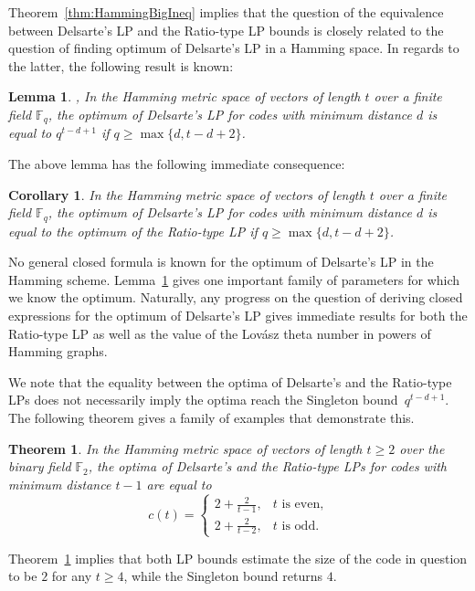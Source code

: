 \documentclass[a4paper]{article}
\newtheorem{corollary}[formula]{Corollary}
\newtheorem{lemma}[formula]{Lemma}
\newtheorem{theorem}[formula]{Theorem}
\newcommand{\F}{\mathbb{F}}
\begin{document}
Theorem~\ref{thm:HammingBigIneq} implies that the question of the equivalence between Delsarte's LP and the Ratio-type LP bounds is closely related to the question of finding optimum of Delsarte's LP in a Hamming space. In regards to the latter, the following result is known:

\begin{lemma}\label{l:DelOptHam}\cite{DelsarteLP}, \cite[Theorem 3.1(b)]{SW2025}
    In the Hamming metric space of vectors of length $t$ over a finite field $\F_q$, the optimum of Delsarte's LP for codes with minimum distance $d$ is equal to $q^{t-d+1}$ if $q\geq\max\{d,t-d+2\}$.
\end{lemma}

The above lemma has the following immediate consequence:

\begin{corollary}
    In the Hamming metric space of vectors of length $t$ over a finite field $\F_q$, the optimum of Delsarte's LP for codes with minimum distance $d$ is equal to the optimum of the Ratio-type LP if $q\geq\max\{d,t-d+2\}$.
\end{corollary}

No general closed formula is known for the optimum of Delsarte’s LP in the Hamming scheme. Lemma~\ref{l:DelOptHam} gives one important family of parameters for which we know the optimum. Naturally, any progress on the question of deriving closed expressions for the optimum of Delsarte’s LP gives immediate results for both the Ratio-type LP as well as the value of the Lov\'asz theta number in powers of Hamming graphs.

We note that the equality between the optima of Delsarte's and the Ratio-type LPs does not necessarily imply the optima reach the Singleton bound~$q^{t-d+1}$. The following theorem gives a family of examples that demonstrate this.

\begin{theorem}\label{thm:Ham_q=2_d=t-1}
    In the Hamming metric space of vectors of length $t\geq2$ over the binary field $\F_2$, the optima of Delsarte's and the Ratio-type LPs for codes with minimum distance $t-1$ are equal to 
    $$c(t)=\begin{cases}
        2+\frac2{t-1}, & t \text{ is even,}\\
        2+\frac2{t-2}, & t \text{ is odd.}
    \end{cases}$$
\end{theorem}

Theorem~\ref{thm:Ham_q=2_d=t-1} implies that both LP bounds estimate the size of the code in question to be $2$ for any $t\geq4$, while the Singleton bound returns $4$.
\end{document}
